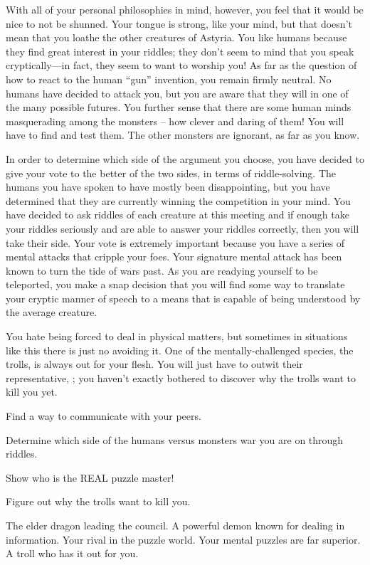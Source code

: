 \documentclass[char]{guildcamp2}
\begin{document}
With all of your personal philosophies in mind, however, you feel that it would be nice to not be shunned. Your tongue is strong, like your mind, but that doesn't mean that you loathe the other creatures of Astyria. You like humans because they find great interest in your riddles; they don't seem to mind that you speak cryptically---in fact, they seem to want to worship you! As far as the question of how to react to the human ``gun'' invention, you remain firmly neutral. No humans have decided to attack you, but you are aware that they will in one of the many possible futures. You further sense that there are some human minds masquerading among the monsters -- how clever and daring of them! You will have to find and test them. The other monsters are ignorant, as far as you know.

In order to determine which side of the argument you choose, you have decided to give your vote to the better of the two sides, in terms of riddle-solving. The humans you have spoken to have mostly been disappointing, but you have determined that they are currently winning the competition in your mind. You have decided to ask riddles of each creature at this meeting and if enough take your riddles seriously and are able to answer your riddles correctly, then you will take their side. Your vote is extremely important because you have a series of mental attacks that cripple your foes. Your signature mental attack has been known to turn the tide of wars past. As you are readying yourself to be teleported, you make a snap decision that you will find some way to translate your cryptic manner of speech to a means that is capable of being understood by the average creature. 

You hate being forced to deal in physical matters, but sometimes in situations like this there is just no avoiding it. One of the mentally-challenged species, the trolls, is always out for your flesh. You will just have to outwit their representative, \cTroll{}; you haven't exactly bothered to discover why the trolls want to kill you yet.

\begin{itemz}[Goals]
  \item Find a way to communicate with your peers.
  \item Determine which side of the humans versus monsters war you are on through riddles.
  \item Show \cMinotaur{} who is the REAL puzzle master!
  \item Figure out why the trolls want to kill you.
\end{itemz}

\begin{contacts}
  \contact{\cOnyx{}} The elder dragon leading the council.
  \contact{\cDemon{}} A powerful demon known for dealing in information.
  \contact{\cMinotaur{}} Your rival in the puzzle world. Your mental puzzles are far superior.
  \contact{\cTroll{}} A troll who has it out for you.
\end{contacts}
\end{document}
